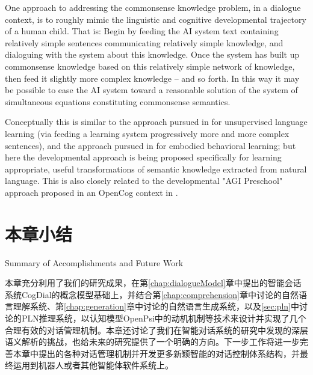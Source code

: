 One approach to addressing the commonsense knowledge problem, in a dialogue context, is to roughly mimic the linguistic
and cognitive developmental trajectory of a human child.  That is: Begin by feeding the AI system text containing relatively
simple sentences communicating relatively simple knowledge, and dialoguing with the system about this knowledge.   Once
the system has built up commonsense knowledge based on this relatively simple network of knowledge, then feed it slightly
more complex knowledge -- and so forth.  In this way it may be possible to ease the AI system toward a reasonable solution
of the system of simultaneous equations constituting commonsense semantics.   

Conceptually this is similar to the approach
pursued in \cite{Spitkovsky2013} for unsupervised language learning (via feeding a learning system progressively more and more complex
sentences), and the approach pursued in \cite{Goertzel2008w} for embodied behavioral learning; but here the developmental approach
is being proposed specifically for learning appropriate, useful transformations of semantic knowledge extracted from natural language.
This is also closely related to the developmental "AGI Preschool" approach proposed in an OpenCog context in \cite{Goertzel2009a}.



\section{本章小结}{Summary of Accomplishments and Future Work}

本章充分利用了我们的研究成果，在第\ref{chap:dialogueModel}章中提出的智能会话系统CogDial的概念模型基础上，并结合第\ref{chap:comprehension}章中讨论的自然语言理解系统、第\ref{chap:generation}章中讨论的自然语言生成系统，以及\ref{sec:pln}中讨论的PLN推理系统，以认知模型OpenPsi中的动机机制等技术来设计并实现了几个合理有效的对话管理机制。本章还讨论了我们在智能对话系统的研究中发现的深层语义解析的挑战，也给未来的研究提供了一个明确的方向。下一步工作将进一步完善本章中提出的各种对话管理机制并开发更多新颖智能的对话控制体系结构，并最终运用到机器人或者其他智能体软件系统上。


